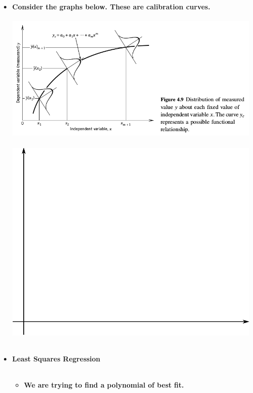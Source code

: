 \documentclass[11pt]{article}
\begin{document}
\begin{itemize}
\begin{itemize}
		\item  \textbf{ \LARGE Consider the graphs below. These are calibration curves.}\\\\
 		\includegraphics[scale=0.65]{lecture4_fig1.png}\\\\
 		\includegraphics[scale=0.40]{lecture4_fig2.png}\\\\      
\Large
\item \textbf{ \LARGE Least Squares Regression} \\\\

	\begin{itemize}
		
		\item \textbf{ We are trying to find a polynomial of best fit.}\\\\ \\\\


\end{itemize}
\end{itemize}
\end{itemize}
\end{document}
